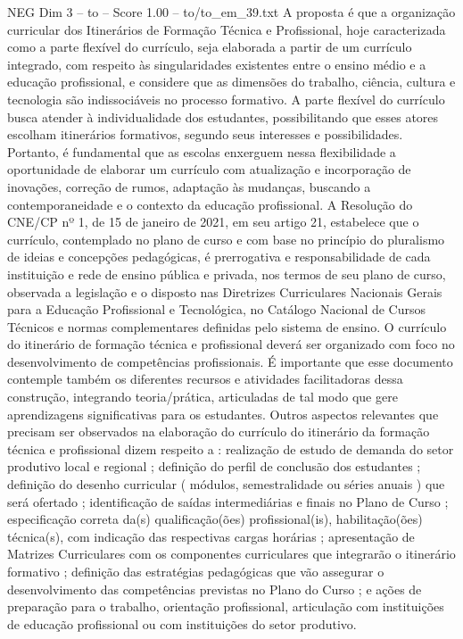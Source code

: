 \begin{textsample}{NEG Dim 3 – to – Score 1.00 – to/to\_em\_39.txt}
A proposta é que a organização curricular dos Itinerários de Formação Técnica e Profissional, hoje caracterizada como a parte flexível do currículo, seja elaborada a partir de um currículo integrado, com respeito às singularidades existentes entre o ensino médio e a educação profissional, e considere que as dimensões do trabalho, ciência, cultura e tecnologia são indissociáveis no processo formativo.
A parte flexível do currículo busca atender à individualidade dos estudantes, possibilitando que esses atores escolham itinerários formativos, segundo seus interesses e possibilidades.
Portanto, é fundamental que as escolas enxerguem nessa flexibilidade a oportunidade de elaborar um currículo com atualização e incorporação de inovações, correção de rumos, adaptação às mudanças, buscando a contemporaneidade e o contexto da educação profissional.
A Resolução do CNE/CP nº 1, de 15 de janeiro de 2021, em seu artigo 21, estabelece que o currículo, contemplado no plano de curso e com base no princípio do pluralismo de ideias e concepções pedagógicas, é prerrogativa e responsabilidade de cada instituição e rede de ensino pública e privada, nos termos de seu plano de curso, observada a legislação e o disposto nas Diretrizes Curriculares Nacionais Gerais para a Educação Profissional e Tecnológica, no Catálogo Nacional de Cursos Técnicos e normas complementares definidas pelo sistema de ensino.
O currículo do itinerário de formação técnica e profissional deverá ser organizado com foco no desenvolvimento de competências profissionais.
É importante que esse documento contemple também os diferentes recursos e atividades facilitadoras dessa construção, integrando teoria/prática, articuladas de tal modo que gere aprendizagens significativas para os estudantes.
Outros aspectos relevantes que precisam ser observados na elaboração do currículo do itinerário da formação técnica e profissional dizem respeito a : realização de estudo de demanda do setor produtivo local e regional ; definição do perfil de conclusão dos estudantes ; definição do desenho curricular ( módulos, semestralidade ou séries anuais ) que será ofertado ; identificação de saídas intermediárias e finais no Plano de Curso ; especificação correta da(s) qualificação(ões) profissional(is), habilitação(ões) técnica(s), com indicação das respectivas cargas horárias ; apresentação de Matrizes Curriculares com os componentes curriculares que integrarão o itinerário formativo ; definição das estratégias pedagógicas que vão assegurar o desenvolvimento das competências previstas no Plano do Curso ; e ações de preparação para o trabalho, orientação profissional, articulação com instituições de educação profissional ou com instituições do setor produtivo.

\end{textsample}
